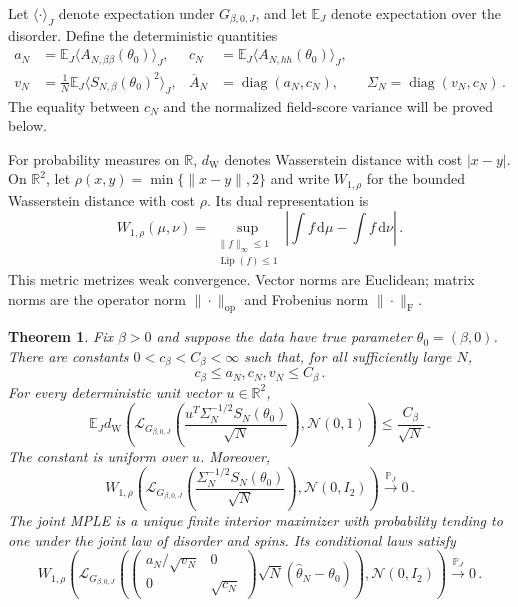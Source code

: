 \documentclass[11pt]{amsart}
\numberwithin{equation}{section}
\newtheorem{theorem}{Theorem}[section]
\theoremstyle{remark}
\newcommand{\E}{\mathbb E}
\newcommand{\Pp}{\mathbb P}
\newcommand{\R}{\mathbb R}
\newcommand{\diag}{\operatorname{diag}}
\newcommand{\op}{\mathrm{op}}
\newcommand{\Frob}{\mathrm{F}}
\newcommand{\Law}{\mathcal L}
\newcommand{\Normal}{\mathcal N}
\newcommand{\dd}{\,\mathrm d}
\begin{document}
Let $\langle\cdot\rangle_J$ denote expectation under $G_{\beta,0,J}$, and let $\E_J$ denote expectation over the disorder. Define the deterministic quantities
\begin{align}
 a_N&=\E_J\langle A_{N,\beta\beta}(\theta_0)\rangle_J,
 &c_N&=\E_J\langle A_{N,hh}(\theta_0)\rangle_J,
 \label{eq:curvature-means}\\
 v_N&=\frac1N\E_J\langle S_{N,\beta}(\theta_0)^2\rangle_J,
 &\overline A_N&=\diag(a_N,c_N),\qquad
 \Sigma_N=\diag(v_N,c_N)\,.
 \label{eq:variance-means}
\end{align}
The equality between $c_N$ and the normalized field-score variance will be proved below.

For probability measures on $\R$, $d_{\mathrm W}$ denotes Wasserstein distance with cost $|x-y|$. On $\R^2$, let $\rho(x,y)=\min\{\|x-y\|,2\}$ and write $W_{1,\rho}$ for the bounded Wasserstein distance with cost $\rho$. Its dual representation is
\begin{equation}
 W_{1,\rho}(\mu,\nu)
 =\sup_{\substack{\|f\|_\infty\le1\\\operatorname{Lip}(f)\le1}}
 \left|\int f\dd\mu-\int f\dd\nu\right|\,.
 \label{eq:bl-distance}
\end{equation}
This metric metrizes weak convergence. Vector norms are Euclidean; matrix norms are the operator norm $\|\cdot\|_\op$ and Frobenius norm $\|\cdot\|_\Frob$.

\begin{theorem}\label{thm:joint}
Fix $\beta>0$ and suppose the data have true parameter $\theta_0=(\beta,0)$. There are constants $0<c_\beta<C_\beta<\infty$ such that, for all sufficiently large $N$,
\begin{equation}
 c_\beta\le a_N,c_N,v_N\le C_\beta\,.
 \label{eq:normalizer-bounds}
\end{equation}
For every deterministic unit vector $u\in\R^2$,
\begin{equation}
 \E_J d_{\mathrm W}\left(
 \Law_{G_{\beta,0,J}}\left(
 \frac{u^T\Sigma_N^{-1/2}S_N(\theta_0)}{\sqrt N}\right),
 \Normal(0,1)\right)
 \le\frac{C_\beta}{\sqrt N}\,.
 \label{eq:directional-rate}
\end{equation}
The constant is uniform over $u$. Moreover,
\begin{equation}
 W_{1,\rho}\left(
 \Law_{G_{\beta,0,J}}\left(\frac{\Sigma_N^{-1/2}S_N(\theta_0)}{\sqrt N}\right),
 \Normal(0,I_2)\right)
 \xrightarrow{\Pp_J}0\,.
 \label{eq:score-quenched}
\end{equation}
The joint MPLE is a unique finite interior maximizer with probability tending to one under the joint law of disorder and spins. Its conditional laws satisfy
\begin{equation}
 W_{1,\rho}\left(
 \Law_{G_{\beta,0,J}}\left(
 \begin{pmatrix}a_N/\sqrt{v_N}&0\\0&\sqrt{c_N}\end{pmatrix}
 \sqrt N(\widehat\theta_N-\theta_0)\right),
 \Normal(0,I_2)\right)
 \xrightarrow{\Pp_J}0\,.
 \label{eq:estimator-quenched}
\end{equation}
\end{theorem}
\end{document}
